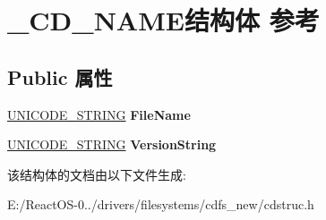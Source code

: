 \hypertarget{struct___c_d___n_a_m_e}{}\section{\+\_\+\+C\+D\+\_\+\+N\+A\+M\+E结构体 参考}
\label{struct___c_d___n_a_m_e}
\subsection*{Public 属性}
\begin{DoxyCompactItemize}
\item 
\mbox{\label{struct___c_d___n_a_m_e_ae106502509971867f68d70603b36485f}} 
\hyperlink{struct___u_n_i_c_o_d_e___s_t_r_i_n_g}{U\+N\+I\+C\+O\+D\+E\+\_\+\+S\+T\+R\+I\+NG} {\bfseries File\+Name}
\item 
\mbox{\label{struct___c_d___n_a_m_e_aac80dcdda4e4804becdab764133fbb0f}} 
\hyperlink{struct___u_n_i_c_o_d_e___s_t_r_i_n_g}{U\+N\+I\+C\+O\+D\+E\+\_\+\+S\+T\+R\+I\+NG} {\bfseries Version\+String}
\end{DoxyCompactItemize}


该结构体的文档由以下文件生成\+:\begin{DoxyCompactItemize}
\item 
E\+:/\+React\+O\+S-\/0../drivers/filesystems/cdfs\+\_\+new/cdstruc.\+h\end{DoxyCompactItemize}

